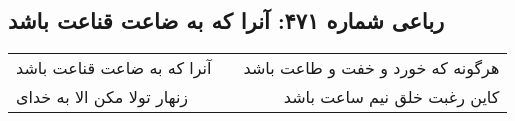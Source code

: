 \begin{center}
\section*{رباعی شماره ۴۷۱: آنرا که به ضاعت قناعت باشد}
\label{sec:0471}
\begin{longtable}{l p{0.5cm} r}
آنرا که به ضاعت قناعت باشد
&&
هرگونه که خورد و خفت و طاعت باشد
\\
زنهار تولا مکن الا به خدای
&&
کاین رغبت خلق نیم ساعت باشد
\\
\end{longtable}
\end{center}
